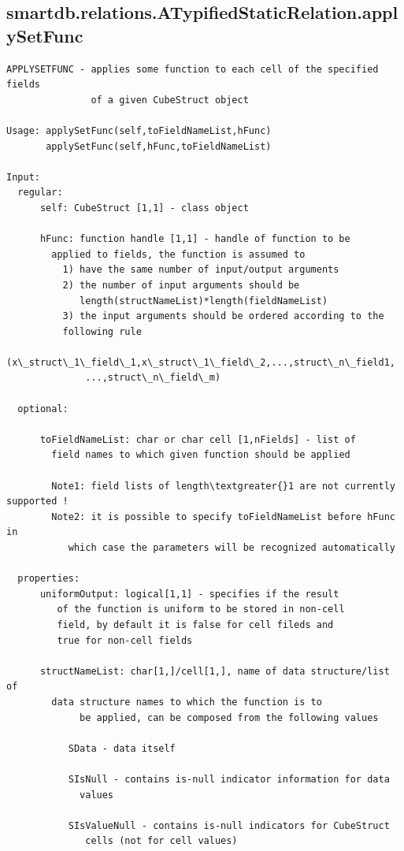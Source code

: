 \documentclass[letterpaper,10pt,english]{sphinxmanual}
\begin{document}
\subsection{smartdb.relations.ATypifiedStaticRelation.applySetFunc}
\label{chap_functions:smartdb-relations-atypifiedstaticrelation-applysetfunc}
\begin{Verbatim}[commandchars=\\\{\}]
APPLYSETFUNC - applies some function to each cell of the specified fields
               of a given CubeStruct object

Usage: applySetFunc(self,toFieldNameList,hFunc)
       applySetFunc(self,hFunc,toFieldNameList)

Input:
  regular:
      self: CubeStruct [1,1] - class object

      hFunc: function handle [1,1] - handle of function to be
        applied to fields, the function is assumed to
          1) have the same number of input/output arguments
          2) the number of input arguments should be
             length(structNameList)*length(fieldNameList)
          3) the input arguments should be ordered according to the
          following rule
              (x\_struct\_1\_field\_1,x\_struct\_1\_field\_2,...,struct\_n\_field1,
              ...,struct\_n\_field\_m)

  optional:

      toFieldNameList: char or char cell [1,nFields] - list of
        field names to which given function should be applied

        Note1: field lists of length\textgreater{}1 are not currently supported !
        Note2: it is possible to specify toFieldNameList before hFunc in
           which case the parameters will be recognized automatically

  properties:
      uniformOutput: logical[1,1] - specifies if the result
         of the function is uniform to be stored in non-cell
         field, by default it is false for cell fileds and
         true for non-cell fields

      structNameList: char[1,]/cell[1,], name of data structure/list of
        data structure names to which the function is to
             be applied, can be composed from the following values

           SData - data itself

           SIsNull - contains is-null indicator information for data
             values

           SIsValueNull - contains is-null indicators for CubeStruct
              cells (not for cell values)


\end{Verbatim}
\end{document}
